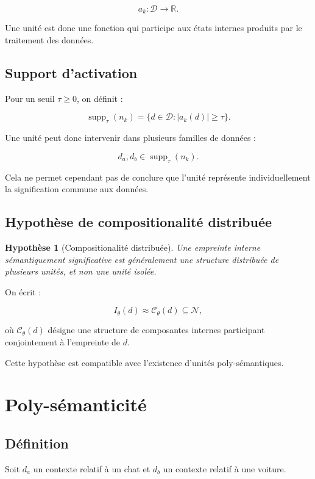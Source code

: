 \documentclass[11pt,a4paper]{article}
\newtheorem{hypothesis}[definition]{Hypothèse}
\newcommand{\D}{\mathcal D}
\newcommand{\R}{\mathbb R}
\newcommand{\supp}{\operatorname{supp}}
\begin{document}
\[
a_k:
\D
\rightarrow
\R.
\]

Une unité est donc une fonction qui participe aux états internes produits
par le traitement des données.

\subsection{Support d'activation}

Pour un seuil $\tau\geq0$, on définit :

\[
\supp_\tau(n_k)
=
\{d\in\D:
|a_k(d)|\geq\tau\}.
\]

Une unité peut donc intervenir dans plusieurs familles de données :

\[
d_a,d_b\in\supp_\tau(n_k).
\]

Cela ne permet cependant pas de conclure que l'unité représente
individuellement la signification commune aux données.

\subsection{Hypothèse de compositionalité distribuée}

\begin{hypothesis}[Compositionalité distribuée]
Une empreinte interne sémantiquement significative est généralement une
structure distribuée de plusieurs unités, et non une unité isolée.
\end{hypothesis}

On écrit :

\[
I_\theta(d)
\approx
\mathcal C_\theta(d)
\subseteq
\mathcal N,
\]

où $\mathcal C_\theta(d)$ désigne une structure de composantes internes
participant conjointement à l'empreinte de $d$.

Cette hypothèse est compatible avec l'existence d'unités poly-sémantiques.

\section{Poly-sémanticité}

\subsection{Définition}

Soit $d_a$ un contexte relatif à un chat et $d_b$ un contexte relatif à une
voiture.
\end{document}
